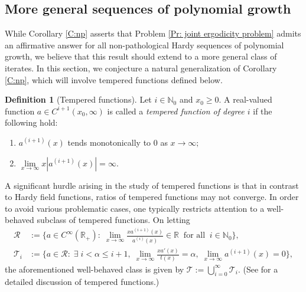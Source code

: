 \documentclass[11pt]{amsart}
\theoremstyle{definition}
\newtheorem{definition}[lemma]{Definition}
\newcommand{\1}{{\mathbf{1}}}
\begin{document}

\medskip


\subsection{More general sequences of polynomial growth} While Corollary \ref{C:np} asserts that Problem \ref{Pr: joint ergodicity problem} admits an affirmative answer for all non-pathological Hardy sequences of polynomial growth, we believe that this result should extend to a more general class of iterates. In this section, we conjecture a natural generalization of Corollary \ref{C:np}, which will involve tempered functions defined below.

\begin{definition}[Tempered functions]
    Let $i\in\mathbb{N}_{0}$ and $x_0\geq 0$. A real-valued function $a\in C^{i+1}(x_0, \infty)$ is called a \emph{tempered function of degree $i$} if the following hold:
\begin{enumerate}
\item $a^{(i+1)}(x)$ tends monotonically to $0$ as $x\to\infty;$
\item  $\lim\limits_{x\to\infty}x|a^{(i+1)}(x)|=\infty.$
\end{enumerate} 
\end{definition}
 

A significant hurdle arising in the study of tempered functions is that in contrast to Hardy field functions, ratios of tempered functions may not converge. In order to avoid various problematic cases, one typically restricts attention to a well-behaved subclass of tempered functions. On letting 
\begin{align*}
    \mathcal{R} &:=\Big\{a\in C^\infty(\mathbb{R}_+):\;\lim_{x\to\infty}\frac{xa^{(i+1)}(x)}{a^{(i)}(x)}\in \mathbb{R}\;\;\text{for all}\;\;i\in\mathbb{N}_{0}\Big\},\\
    \mathcal{T}_i&:=\Big\{a\in\mathcal{R}:\;\exists\;i<\alpha\leq i+1,\;\lim_{x\to\infty}\frac{xa'(x)}{t(x)}=\alpha,\;\lim_{x\to\infty}a^{(i+1)}(x)=0\Big\},
\end{align*}
the aforementioned well-behaved class is given by $\mathcal{T}:=\bigcup_{i=0}^\infty \mathcal{T}_i$. (See \cite{BeHK09, Kouts21} for a detailed discussion of tempered functions.)
\end{document}
